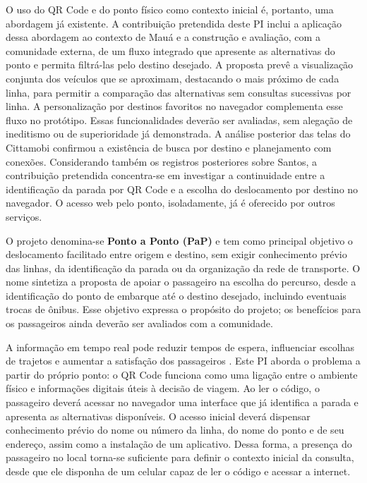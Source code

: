 \documentclass[12pt,oneside,a4paper,brazil,chapter=TITLE]{abntex2}
\begin{document}
O uso do QR Code e do ponto físico como contexto inicial é, portanto, uma abordagem já existente. A contribuição pretendida deste PI inclui a aplicação dessa abordagem ao contexto de Mauá e a construção e avaliação, com a comunidade externa, de um fluxo integrado que apresente as alternativas do ponto e permita filtrá-las pelo destino desejado. A proposta prevê a visualização conjunta dos veículos que se aproximam, destacando o mais próximo de cada linha, para permitir a comparação das alternativas sem consultas sucessivas por linha. A personalização por destinos favoritos no navegador complementa esse fluxo no protótipo. Essas funcionalidades deverão ser avaliadas, sem alegação de ineditismo ou de superioridade já demonstrada. A análise posterior das telas do Cittamobi confirmou a existência de busca por destino e planejamento com conexões. Considerando também os registros posteriores sobre Santos, a contribuição pretendida concentra-se em investigar a continuidade entre a identificação da parada por QR Code e a escolha do deslocamento por destino no navegador. O acesso web pelo ponto, isoladamente, já é oferecido por outros serviços.

O projeto denomina-se \textbf{Ponto a Ponto (PaP)} e tem como principal objetivo o deslocamento facilitado entre origem e destino, sem exigir conhecimento prévio das linhas, da identificação da parada ou da organização da rede de transporte. O nome sintetiza a proposta de apoiar o passageiro na escolha do percurso, desde a identificação do ponto de embarque até o destino desejado, incluindo eventuais trocas de ônibus. Esse objetivo expressa o propósito do projeto; os benefícios para os passageiros ainda deverão ser avaliados com a comunidade.

A informação em tempo real pode reduzir tempos de espera, influenciar escolhas de trajetos e aumentar a satisfação dos passageiros \citep{brakewood2019}. Este PI aborda o problema a partir do próprio ponto: o QR Code funciona como uma ligação entre o ambiente físico e informações digitais úteis à decisão de viagem. Ao ler o código, o passageiro deverá acessar no navegador uma interface que já identifica a parada e apresenta as alternativas disponíveis. O acesso inicial deverá dispensar conhecimento prévio do nome ou número da linha, do nome do ponto e de seu endereço, assim como a instalação de um aplicativo. Dessa forma, a presença do passageiro no local torna-se suficiente para definir o contexto inicial da consulta, desde que ele disponha de um celular capaz de ler o código e acessar a internet.
\end{document}
